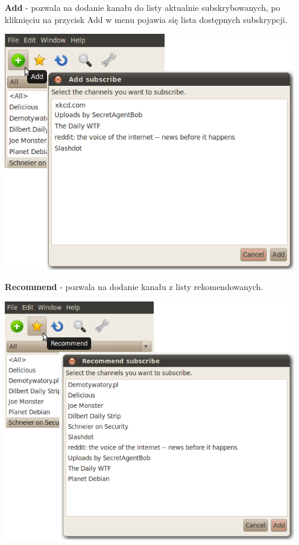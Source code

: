 \documentclass[a4paper,11pt]{report}
\begin{document}
\begin{itemize}
	\item[\textbf{Add}] - pozwala na dodanie kanału do listy aktualnie 
		subskrybowanych, po kliknięciu na przycisk Add w menu pojawia
		się lista dostępnych subskrypcji.
	\begin{center}
		\includegraphics[scale=0.5]{./img/menu_add.png}
	\end{center}

	\newpage
	\item[\textbf{Recommend}] - pozwala na dodanie kanału z listy 
				    rekomendowanych.
	\begin{center}
		\includegraphics[scale=0.5]{./img/menu_recom.png}
	\end{center}


\end{itemize}
\end{document}
